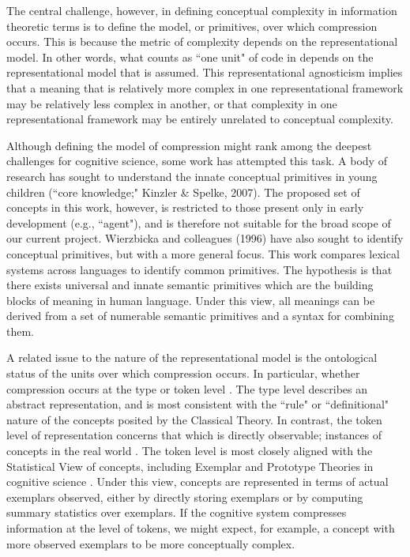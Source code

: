 The central challenge, however, in defining conceptual complexity in information theoretic terms is to define the model, or primitives, over which compression occurs. This is because the metric of complexity depends on the representational model. In other words, what counts as ``one unit" of code in depends on the representational model that is assumed. This representational agnosticism implies that a meaning that is relatively more complex in one representational framework may be relatively less complex in another, or that  complexity in one representational framework may be entirely unrelated to conceptual complexity.

Although defining the model of compression might rank among the deepest challenges for cognitive science, some work has attempted this task. A body of research has sought to understand the innate conceptual primitives in young children (``core knowledge;" Kinzler \& Spelke, 2007). \nocite{kinzler2007core} The proposed set of concepts in this work, however, is restricted to those present only  in early development (e.g., ``agent"), and is therefore not suitable for the broad scope of our current project.  Wierzbicka and colleagues (1996) have also  sought  to identify conceptual primitives, but with a more general focus.  \nocite{wierzbicka1996semantics} This work compares lexical systems across languages  to identify common primitives. The hypothesis is that there exists universal and innate semantic primitives which are the building blocks of meaning in human language. Under this view, all meanings can be derived from a set of numerable semantic primitives and a syntax for combining them.
 
A related issue to the nature of the representational model is the ontological status of the units over which compression occurs. In particular, whether compression occurs at the type or token level \cite{peirce}. The type level describes an abstract representation, and is most consistent with the ``rule" or ``definitional" nature of the concepts posited by the Classical Theory. In contrast, the token level of representation concerns that which is directly observable; instances of concepts in the real world .  The token level is most closely aligned with the Statistical View of concepts, including Exemplar and Prototype Theories in cognitive science  \cite{laurence1999concepts}. Under this view, concepts are represented in terms of actual exemplars observed, either by directly storing exemplars or by computing summary statistics over exemplars. If the cognitive system compresses information at the level of tokens, we might expect, for example, a concept with more observed exemplars to be more conceptually complex. 

